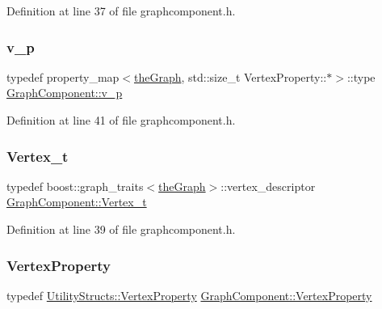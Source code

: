 Definition at line 37 of file graphcomponent.\+h.

\mbox{\label{class_graph_component_ad40772702161324303e24463a63738e9}} 
\subsubsection{\texorpdfstring{v\+\_\+p}{v\_p}}
{\footnotesize\ttfamily typedef property\+\_\+map$<$\hyperlink{class_graph_component_a982e0748a6e1b8dc74986f5f8b3dca5c}{the\+Graph}, std\+::size\+\_\+t Vertex\+Property\+::$\ast$$>$\+::type \hyperlink{class_graph_component_ad40772702161324303e24463a63738e9}{Graph\+Component\+::v\+\_\+p}}



Definition at line 41 of file graphcomponent.\+h.

\mbox{\label{class_graph_component_ae67114a6ce5a001dc35e1996e1b45aa0}} 
\subsubsection{\texorpdfstring{Vertex\+\_\+t}{Vertex\_t}}
{\footnotesize\ttfamily typedef boost\+::graph\+\_\+traits$<$\hyperlink{class_graph_component_a982e0748a6e1b8dc74986f5f8b3dca5c}{the\+Graph}$>$\+::vertex\+\_\+descriptor \hyperlink{class_graph_component_ae67114a6ce5a001dc35e1996e1b45aa0}{Graph\+Component\+::\+Vertex\+\_\+t}}



Definition at line 39 of file graphcomponent.\+h.

\mbox{\label{class_graph_component_a7c0fcb3f03bf188b7df520e0cdd364b7}} 
\subsubsection{\texorpdfstring{Vertex\+Property}{VertexProperty}}
{\footnotesize\ttfamily typedef \hyperlink{struct_utility_structs_1_1_vertex_property}{Utility\+Structs\+::\+Vertex\+Property} \hyperlink{class_graph_component_a7c0fcb3f03bf188b7df520e0cdd364b7}{Graph\+Component\+::\+Vertex\+Property}}




